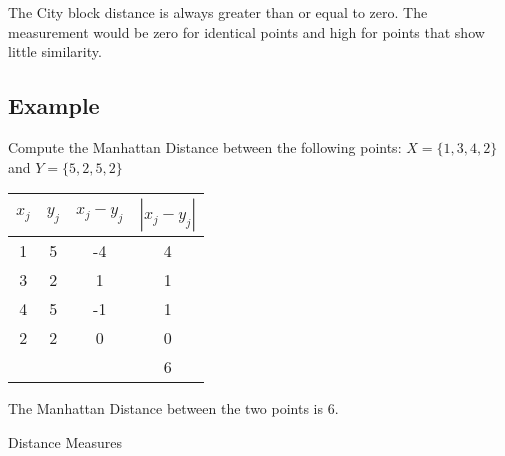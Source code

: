 The City block distance is always greater than or equal to zero. The measurement would be zero for identical points and high for points that show little similarity.

\subsection{Example}
Compute the Manhattan Distance between the following points: 
$X = \{1,3,4,2\}$ and $Y = \{5,2,5,2\}$


\begin{center}
\begin{tabular}{|c|c|c|c|}
  \hline
$x_j$	&	$y_j$	&   $x_j - y_j$	&	$| x_j - y_j |$	\\ \hline
1	&	5	&	-4	&	4	\\
3	&	2	&	1	&	1	\\
4	&	5	&	-1	&	1	\\
2	&	2	&	0	&	0	\\ \hline
& & & 6 \\
  \hline
\end{tabular}
\end{center}
The Manhattan Distance between the two points is 6.


Distance Measures

